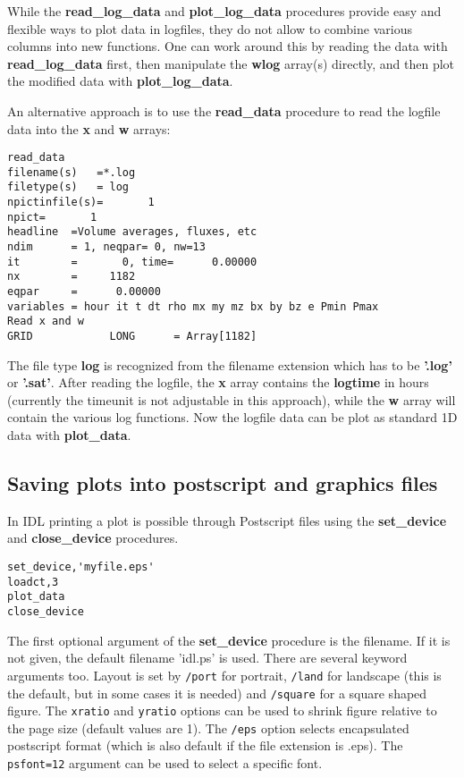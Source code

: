 \documentclass{article}
\begin{document}
While the {\bf read\_log\_data} and {\bf plot\_log\_data} procedures 
provide easy and flexible ways to plot data in logfiles, 
they do not allow to combine various columns
into new functions. One can work around this by reading the data
with {\bf read\_log\_data} first, then manipulate the {\bf wlog} array(s) 
directly, and then plot the modified data with {\bf plot\_log\_data}. 

An alternative approach is to use the {\bf read\_data} procedure to read
the logfile data into the {\bf x} and {\bf w} arrays:
\begin{verbatim}
read_data
filename(s)   =*.log
filetype(s)   = log
npictinfile(s)=       1
npict=       1
headline  =Volume averages, fluxes, etc
ndim      = 1, neqpar= 0, nw=13
it        =       0, time=      0.00000
nx        =     1182
eqpar     =      0.00000
variables = hour it t dt rho mx my mz bx by bz e Pmin Pmax
Read x and w
GRID            LONG      = Array[1182]
\end{verbatim}
The file type {\bf log} is recognized from the filename extension which
has to be {\bf '.log'} or {\bf '.sat'}. After reading the logfile,
the {\bf x} array contains the {\bf logtime} in hours 
(currently the timeunit is not adjustable in this approach), 
while the {\bf w} array will contain the various log functions. 
Now the logfile data can be plot as standard 1D data with {\bf plot\_data}.

\subsection{Saving plots into postscript and graphics files 
                \label{s-postscript}}

In IDL printing a plot is possible through Postscript files
using the {\bf set\_device} and {\bf close\_device} procedures.
\begin{verbatim}
set_device,'myfile.eps'
loadct,3
plot_data
close_device
\end{verbatim}
The first optional argument of the {\bf set\_device} procedure is the filename.
If it is not given, the default filename 'idl.ps' is used.
There are several keyword arguments too. Layout is set by 
{\tt /port} for portrait, {\tt /land} for landscape 
(this is the default, but in some cases it is needed)
and {\tt /square} for a square shaped figure.
The {\tt xratio} and {\tt yratio} options can be used
to shrink figure relative to the page size (default values are 1).
The {\tt /eps} option selects encapsulated postscript format (which is also
default if the file extension is .eps).
The {\tt psfont=12} argument can be used to select a specific font. 
\end{document}
